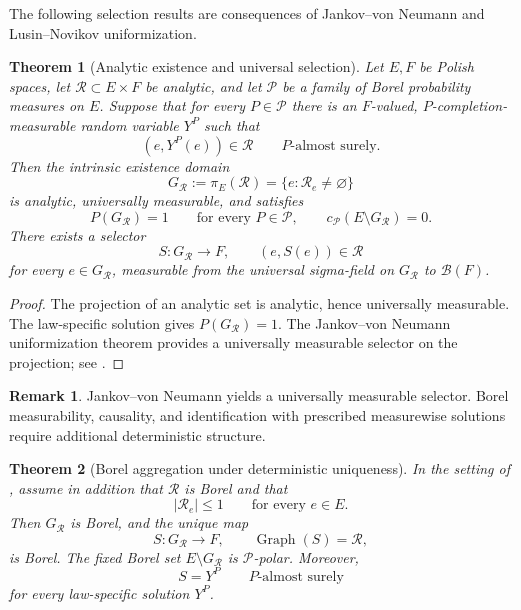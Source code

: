 \documentclass[11pt,reqno]{amsart}
\theoremstyle{plain}
\newtheorem{theorem}{Theorem}[section]
\theoremstyle{definition}
\newtheorem{remark}[remark]{Remark}
\newcommand{\cB}{\mathcal B}
\newcommand{\cP}{\mathcal P}
\newcommand{\cR}{\mathcal R}
\newcommand{\Graph}{\operatorname{Graph}}
\newcommand{\abs}[1]{\left\lvert #1\right\rvert}
\begin{document}
The following selection results are consequences of Jankov--von Neumann and
Lusin--Novikov uniformization.

\begin{theorem}[Analytic existence and universal selection]
\label{thm:analytic-selection}
Let \(E,F\) be Polish spaces, let
\(\cR\subset E\times F\) be analytic, and let \(\cP\) be a family of Borel
probability measures on \(E\).  Suppose that for every \(P\in\cP\) there is
an \(F\)-valued, \(P\)-completion-measurable random variable \(Y^P\) such
that
\[
  (e,Y^P(e))\in\cR
  \qquad P\text{-almost surely}.
\]
Then the intrinsic existence domain
\begin{equation}\label{eq:intrinsic-existence-domain}
  G_{\cR}:=\pi_E(\cR)=\{e:\cR_e\ne\varnothing\}
\end{equation}
is analytic, universally measurable, and satisfies
\[
  P(G_{\cR})=1\qquad\text{for every }P\in\cP,
  \qquad
  c_{\cP}(E\setminus G_{\cR})=0.
\]
There exists a selector
\[
  S:G_{\cR}\longrightarrow F,
  \qquad
  (e,S(e))\in\cR
\]
for every \(e\in G_{\cR}\), measurable from the universal sigma-field on
\(G_{\cR}\) to \(\cB(F)\).
\end{theorem}

\begin{proof}
The projection of an analytic set is analytic, hence universally measurable.
The law-specific solution gives \(P(G_{\cR})=1\).  The
Jankov--von Neumann uniformization theorem provides a universally measurable
selector on the projection; see \cite{Kechris95}.
\end{proof}

\begin{remark}\label{rem:selection-not-causal}
Jankov--von Neumann yields a universally measurable selector.  Borel
measurability, causality, and identification with prescribed measurewise
solutions require additional deterministic structure.
\end{remark}

\begin{theorem}[Borel aggregation under deterministic uniqueness]
\label{thm:borel-aggregation}
In the setting of , assume in addition that
\(\cR\) is Borel and that
\begin{equation}\label{eq:singleton-sections}
  \abs{\cR_e}\le1\qquad\text{for every }e\in E.
\end{equation}
Then \(G_{\cR}\) is Borel, and the unique map
\[
  S:G_{\cR}\longrightarrow F,
  \qquad
  \Graph(S)=\cR,
\]
is Borel.  The fixed Borel set \(E\setminus G_{\cR}\) is
\(\cP\)-polar.  Moreover,
\begin{equation}\label{eq:aggregate-equality}
  S=Y^P\qquad P\text{-almost surely}
\end{equation}
for every law-specific solution \(Y^P\).
\end{theorem}
\end{document}
